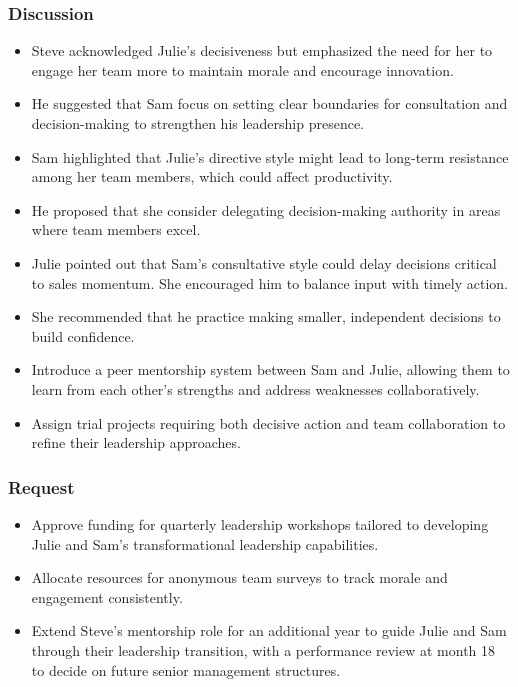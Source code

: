 \documentclass[a4paper,12pt]{article}
\begin{document}
\subsubsection{Discussion}

\begin{itemize}
        \item Steve acknowledged Julie’s decisiveness but emphasized the need for her to engage her team more to maintain morale and encourage innovation.
        \item He suggested that Sam focus on setting clear boundaries for consultation and decision-making to strengthen his leadership presence.
    \end{itemize}
    \begin{itemize}
        \item Sam highlighted that Julie’s directive style might lead to long-term resistance among her team members, which could affect productivity.
        \item He proposed that she consider delegating decision-making authority in areas where team members excel.
    \end{itemize}
    \begin{itemize}
        \item Julie pointed out that Sam’s consultative style could delay decisions critical to sales momentum. She encouraged him to balance input with timely action.
        \item She recommended that he practice making smaller, independent decisions to build confidence.
    \end{itemize}
    \begin{itemize}
        \item Introduce a peer mentorship system between Sam and Julie, allowing them to learn from each other’s strengths and address weaknesses collaboratively.
        \item Assign trial projects requiring both decisive action and team collaboration to refine their leadership approaches.
    \end{itemize}

\subsubsection{Request}

\begin{itemize}
    \item Approve funding for quarterly leadership workshops tailored to developing Julie and Sam’s transformational leadership capabilities.
    \item Allocate resources for anonymous team surveys to track morale and engagement consistently.
    \item Extend Steve’s mentorship role for an additional year to guide Julie and Sam through their leadership transition, with a performance review at month 18 to decide on future senior management structures.
\end{itemize}
\end{document}
